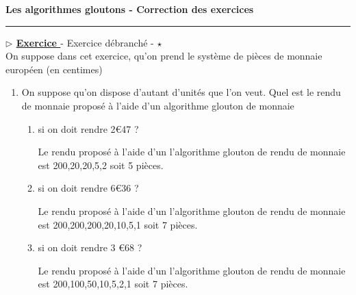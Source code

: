 \documentclass[12pt,french]{article}
\newcounter{npb}
\newcommand{\exo}{
    \stepcounter{npb}
    {\textbf{$\triangleright$ \underline{Exercice \arabic{npb} }}}
}
\newcounter{sf}
\begin{document}
    \chead{}
      \renewcommand{\headrulewidth}{0.5pt}
      \lfoot{                      }
    \pagestyle{fancy}
    \renewcommand{\footrulewidth}{0.4pt}
\begin{center}
\textbf{\Large{Les algorithmes gloutons - Correction des exercices   }}\end{center}
\hrule
\bigskip
\exo  - Exercice débranché - $\star$ \\
On suppose dans cet exercice, qu'on prend le système de pièces de monnaie européen (en centimes)
\begin{enumerate}
	\item On suppose qu'on dispose d'autant d'unités que l'on veut.  Quel est le rendu de monnaie proposé à l'aide d'un algorithme glouton de monnaie 
	\begin{enumerate}
		\item si on doit rendre 2\euro 47 ? 
		 
	\begin{tcolorbox}[enhanced,attach boxed title to top center={yshift=-3mm,yshifttext=-1mm},
		colback=blue!5!white,colframe=blue!75!black,colbacktitle=blue!25!black,
		title=solution :, fonttitle=\bfseries,
		boxed title style={size=small,colframe=green!25!black} ] Le rendu proposé à l'aide d'un l'algorithme glouton de rendu de monnaie est 200,20,20,5,2 soit 5 pièces.
	\end{tcolorbox} 
		
		\item si on doit rendre 6\euro 36 ?
		
			\begin{tcolorbox}[enhanced,attach boxed title to top center={yshift=-3mm,yshifttext=-1mm},
			colback=blue!5!white,colframe=blue!75!black,colbacktitle=blue!25!black,
			title=solution :, fonttitle=\bfseries,
			boxed title style={size=small,colframe=green!25!black} ]
			Le rendu proposé à l'aide d'un l'algorithme glouton de rendu de monnaie est 200,200,200,20,10,5,1 soit 7 pièces.
		\end{tcolorbox} 
		
		\item si on doit rendre 3 \euro 68 ?
	
	\begin{tcolorbox}[enhanced,attach boxed title to top center={yshift=-3mm,yshifttext=-1mm},
		colback=blue!5!white,colframe=blue!75!black,colbacktitle=blue!25!black,
		title=solution :, fonttitle=\bfseries,
		boxed title style={size=small,colframe=green!25!black} ]Le rendu proposé à l'aide d'un l'algorithme glouton de rendu de monnaie est 200,100,50,10,5,2,1 soit 7 pièces.
	\end{tcolorbox} 
		

\end{enumerate}
\end{enumerate}
\end{document}
